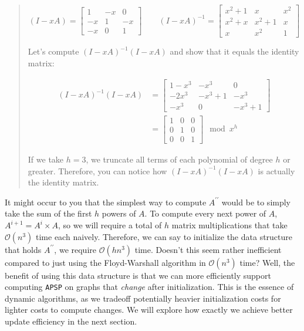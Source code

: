 \documentclass[12pt]{article}
\newcommand{\bigO}{\mathcal{O}}
\begin{document}
\begin{quote}
    \[
        (I - xA) =
        \begin{bmatrix}
            1 & -x & 0 \\
            -x & 1 & -x \\
            -x & 0 & 1
        \end{bmatrix}
        \qquad
        (I - xA)^{-1} =
        \begin{bmatrix}
            x^2 + 1 & x & x^2 \\
            x^2 + x & x^2 + 1 & x \\
            x & x^2 & 1
        \end{bmatrix}
    \]

    Let's compute $(I - xA)^{-1} (I - xA)$ and show that it equals the identity matrix:

    \[
        \begin{split}
            (I - xA)^{-1} (I - xA) &=
            \begin{bmatrix}
                1 - x^3 & -x^3 & 0 \\
                -2x^3 & -x^3 + 1 & -x^3 \\
                -x^3 & 0 & -x^3 + 1
            \end{bmatrix} \\
            &=
            \begin{bmatrix}
                1 & 0 & 0 \\
                0 & 1 & 0 \\
                0 & 0 & 1
            \end{bmatrix}
            \mod x^h
        \end{split}
    \]

    If we take $h = 3$, we truncate all terms of each polynomial of degree $h$ or greater. Therefore, you can notice how $(I - xA)^{-1} (I - xA)$ is actually the identity matrix.
\end{quote}

It might occur to you that the simplest way to compute $A^{\prime \prime}$ would be to simply take the sum of the first $h$ powers of $A$. To compute every next power of $A$, $A^{i + 1} = A^i \times A$, so we will require a total of $h$ matrix multiplications that take $\bigO(n^3)$ time each naively. Therefore, we can say to initialize the data structure that holds $A^{\prime \prime}$, we require $\bigO(h n^3)$ time. Doesn't this seem rather inefficient compared to just using the Floyd-Warshall algorithm in $\bigO(n^3)$ time? Well, the benefit of using this data structure is that we can more efficiently support computing \texttt{APSP} on graphs that \emph{change} after initialization. This is the essence of dynamic algorithms, as we tradeoff potentially heavier initialization costs for lighter costs to compute changes. We will explore how exactly we achieve better update efficiency in the next section.
\end{document}
